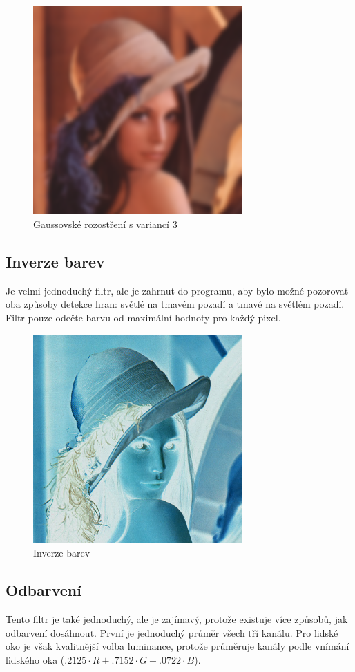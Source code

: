 \documentclass[11pt]{article}
\begin{document}
\begin{figure}[ht!]
\centering
	\includegraphics[width=8cm]{gaus.png}
	\caption{Gaussovské rozostření s variancí 3}
\end{figure}
\clearpage

\subsection{Inverze barev}
Je velmi jednoduchý filtr, ale je zahrnut do programu, aby bylo možné pozorovat
oba způsoby detekce hran: světlé na tmavém pozadí a tmavé na světlém pozadí.
Filtr pouze odečte barvu od maximální hodnoty pro každý pixel.

\begin{figure}[ht!]
\centering
	\includegraphics[width=8cm]{invert.png}
	\caption{Inverze barev}
\end{figure}
\clearpage

\subsection{Odbarvení}
Tento filtr je také jednoduchý, ale je zajímavý, protože existuje více způsobů,
jak odbarvení dosáhnout. První je jednoduchý průměr všech tří kanálu. Pro
lidské oko je však kvalitnější volba luminance, protože průměruje kanály
podle vnímání lidského oka ($.2125\cdot R + .7152\cdot G + .0722\cdot B$).
\end{document}

